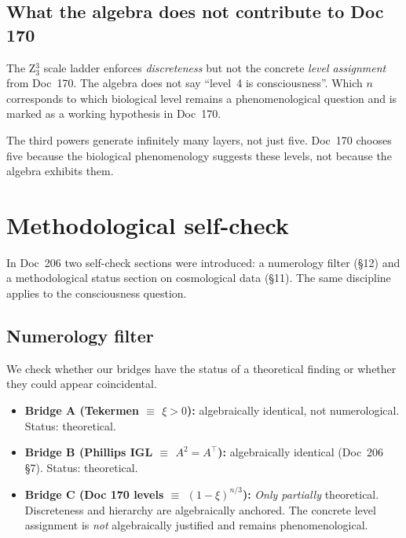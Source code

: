 \subsection{What the algebra does not contribute to Doc 170}

\begin{important}
The Z$_3^3$ scale ladder enforces \emph{discreteness} but not the concrete \emph{level assignment} from Doc~170. The algebra does not say ``level~4 is consciousness''. Which $n$ corresponds to which biological level remains a phenomenological question and is marked as a working hypothesis in Doc~170.
\end{important}

The third powers generate infinitely many layers, not just five. Doc~170 chooses five because the biological phenomenology suggests these levels, not because the algebra exhibits them.

\section{Methodological self-check}\label{sec:methodology}

In Doc~206 two self-check sections were introduced: a numerology filter (\S12) and a methodological status section on cosmological data (\S11). The same discipline applies to the consciousness question.

\subsection{Numerology filter}

We check whether our bridges have the status of a theoretical finding or whether they could appear coincidental.

\begin{itemize}
\item \textbf{Bridge A (Tekermen $\equiv$ $\xi > 0$):} algebraically identical, not numerological. Status: theoretical.
\item \textbf{Bridge B (Phillips IGL $\equiv$ $A^2 = A^\top$):} algebraically identical (Doc~206 \S7). Status: theoretical.
\item \textbf{Bridge C (Doc 170 levels $\equiv$ $(1-\xi)^{n/3}$):} \emph{Only partially} theoretical. Discreteness and hierarchy are algebraically anchored. The concrete level assignment is \emph{not} algebraically justified and remains phenomenological.
\end{itemize}

